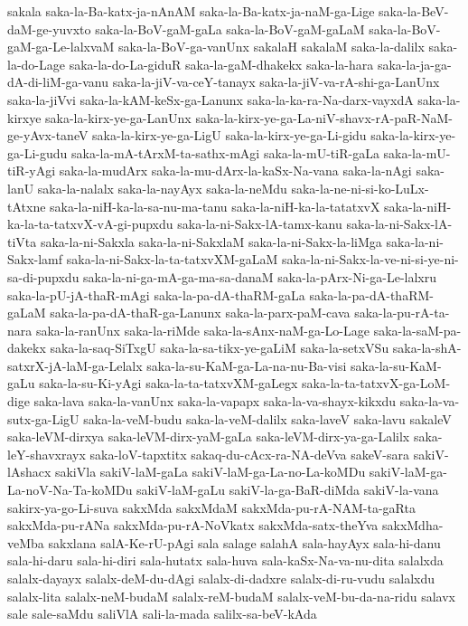 {sakala
saka-la-Ba-katx-ja-nAnAM
saka-la-Ba-katx-ja-naM-ga-Lige
saka-la-BeV-daM-ge-yuvxto
saka-la-BoV-gaM-gaLa
saka-la-BoV-gaM-gaLaM
saka-la-BoV-gaM-ga-Le-lalxvaM
saka-la-BoV-ga-vanUnx
sakalaH
sakalaM
saka-la-dalilx
saka-la-do-Lage
saka-la-do-La-giduR
saka-la-gaM-dhakekx
saka-la-hara
saka-la-ja-ga-dA-di-liM-ga-vanu
saka-la-jiV-va-ceY-tanayx
saka-la-jiV-va-rA-shi-ga-LanUnx
saka-la-jiVvi
saka-la-kAM-keSx-ga-Lanunx
saka-la-ka-ra-Na-darx-vayxdA
saka-la-kirxye
saka-la-kirx-ye-ga-LanUnx
saka-la-kirx-ye-ga-La-niV-shavx-rA-paR-NaM-ge-yAvx-taneV
saka-la-kirx-ye-ga-LigU
saka-la-kirx-ye-ga-Li-gidu
saka-la-kirx-ye-ga-Li-gudu
saka-la-mA-tArxM-ta-sathx-mAgi
saka-la-mU-tiR-gaLa
saka-la-mU-tiR-yAgi
saka-la-mudArx
saka-la-mu-dArx-la-kaSx-Na-vana
saka-la-nAgi
saka-lanU
saka-la-nalalx
saka-la-nayAyx
saka-la-neMdu
saka-la-ne-ni-si-ko-LuLx-tAtxne
saka-la-niH-ka-la-sa-nu-ma-tanu
saka-la-niH-ka-la-tatatxvX
saka-la-niH-ka-la-ta-tatxvX-vA-gi-pupxdu
saka-la-ni-Sakx-lA-tamx-kanu
saka-la-ni-Sakx-lA-tiVta
saka-la-ni-Sakxla
saka-la-ni-SakxlaM
saka-la-ni-Sakx-la-liMga
saka-la-ni-Sakx-lamf
saka-la-ni-Sakx-la-ta-tatxvXM-gaLaM
saka-la-ni-Sakx-la-ve-ni-si-ye-ni-sa-di-pupxdu
saka-la-ni-ga-mA-ga-ma-sa-danaM
saka-la-pArx-Ni-ga-Le-lalxru
saka-la-pU-jA-thaR-mAgi
saka-la-pa-dA-thaRM-gaLa
saka-la-pa-dA-thaRM-gaLaM
saka-la-pa-dA-thaR-ga-Lanunx
saka-la-parx-paM-cava
saka-la-pu-rA-ta-nara
saka-la-ranUnx
saka-la-riMde
saka-la-sAnx-naM-ga-Lo-Lage
saka-la-saM-pa-dakekx
saka-la-saq-SiTxgU
saka-la-sa-tikx-ye-gaLiM
saka-la-setxVSu
saka-la-shA-satxrX-jA-laM-ga-Lelalx
saka-la-su-KaM-ga-La-na-nu-Ba-visi
saka-la-su-KaM-gaLu
saka-la-su-Ki-yAgi
saka-la-ta-tatxvXM-gaLegx
saka-la-ta-tatxvX-ga-LoM-dige
saka-lava
saka-la-vanUnx
saka-la-vapapx
saka-la-va-shayx-kikxdu
saka-la-va-sutx-ga-LigU
saka-la-veM-budu
saka-la-veM-dalilx
saka-laveV
saka-lavu
sakaleV
saka-leVM-dirxya
saka-leVM-dirx-yaM-gaLa
saka-leVM-dirx-ya-ga-Lalilx
saka-leY-shavxrayx
saka-loV-tapxtitx
sakaq-du-cAcx-ra-NA-deVva
sakeV-sara
sakiV-lAshacx
sakiVla
sakiV-laM-gaLa
sakiV-laM-ga-La-no-La-koMDu
sakiV-laM-ga-La-noV-Na-Ta-koMDu
sakiV-laM-gaLu
sakiV-la-ga-BaR-diMda
sakiV-la-vana
sakirx-ya-go-Li-suva
sakxMda
sakxMdaM
sakxMda-pu-rA-NAM-ta-gaRta
sakxMda-pu-rANa
sakxMda-pu-rA-NoVkatx
sakxMda-satx-theYva
sakxMdha-veMba
sakxlana
salA-Ke-rU-pAgi
sala
salage
salahA
sala-hayAyx
sala-hi-danu
sala-hi-daru
sala-hi-diri
sala-hutatx
sala-huva
sala-kaSx-Na-va-nu-dita
salalxda
salalx-dayayx
salalx-deM-du-dAgi
salalx-di-dadxre
salalx-di-ru-vudu
salalxdu
salalx-lita
salalx-neM-budaM
salalx-reM-budaM
salalx-veM-bu-da-na-ridu
salavx
sale
sale-saMdu
saliVlA
sali-la-mada
salilx-sa-beV-kAda
}
